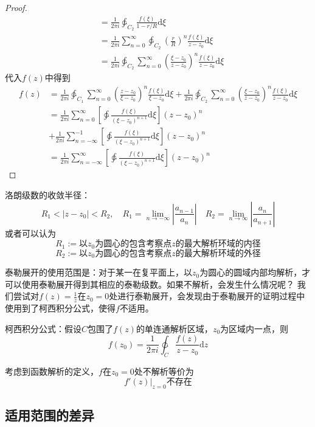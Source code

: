 \documentclass[12pt, a4paper, oneside]{ctexart}
\def\D{\mathrm{d}}
\newcommand{\F}[1][z]
{\ensuremath{f(#1)}}
\begin{document}
\begin{proof}
\begin{align*}
         & = \frac{1}{2\pi i} \ointctrclockwise_{C_2} \frac{\F[\xi]}{1-r/R}\D \xi                                                          \\
         & =\frac{1}{2\pi i} \sum_{n=0}^\infty \ointctrclockwise_{C_2} \left(\frac{r}{R}\right)^n  \frac{\F[\xi]}{z-z_0} \D \xi            \\
         & = \frac{1}{2\pi i} \ointctrclockwise_{C_2} \sum_{n=0}^\infty \left(\frac{\xi-z_0}{z-z_0}\right)^n  \frac{\F[\xi]}{z-z_0} \D \xi
    \end{align*}
    代入$\F$中得到
    \begin{align*}
        \F & =\frac{1}{2\pi i} \ointctrclockwise_{C_1} \sum_{n=0}^\infty  \left(\frac{z-z_0}{\xi-z_0}\right)^n  \frac{\F[\xi]}{\xi-z_0} \D \xi
        + \frac{1}{2\pi i} \ointctrclockwise_{C_2} \sum_{n=0}^\infty \left(\frac{\xi-z_0}{z-z_0}\right)^n  \frac{\F[\xi]}{z-z_0} \D \xi        \\
           & = \frac{1}{2\pi i}  \sum_{n=0}^\infty \left[\ointctrclockwise \frac{\F[\xi]}{(\xi-z_0)^{n+1}}\D \xi \right](z-z_0)^n              \\
           & +\frac{1}{2\pi i}  \sum_{n=-\infty}^{-1} \left[\ointctrclockwise \frac{\F[\xi]}{(\xi-z_0)^{n+1}}\D \xi\right](z-z_0)^n            \\
           & = \frac{1}{2\pi i}  \sum_{n=-\infty}^\infty \left[\ointctrclockwise \frac{\F[\xi]}{(\xi-z_0)^{n+1}}\D \xi \right](z-z_0)^n
    \end{align*}
\end{proof}
洛朗级数的收敛半径：
$$
    R_1<|z-z_0|<R_2,\quad R_1=\lim_{n\to -\infty} \left| \frac{a_{n-1}}{a_n} \right|\quad R_2=\lim_{n \to \infty} \left| \frac{a_n}{a_{n+1}} \right|
$$
或者可以认为
$$R_1 := \text{以$z_0$为圆心的包含考察点$z$的最大解析环域的内径}$$
$$R_2 := \text{以$z_0$为圆心的包含考察点$z$的最大解析环域的外径}$$

泰勒展开的使用范围是：对于某一在复平面上，以$z_0$为圆心的圆域内部均解析，才可以使用泰勒展开得到其相应的泰勒级数。如果不解析，会发生什么情况呢？
我们尝试对$f(z)=\frac{1}{z}$在$z_0=0$处进行泰勒展开，会发现由于泰勒展开的证明过程中使用到了柯西积分公式，使得$f$不适用。

柯西积分公式：假设$C$包围了$\F$的单连通解析区域，$z_0$为区域内一点，则
$$\F[z_0]=\frac{1}{2\pi i}\ointctrclockwise_C \frac{\F}{z-z_0}\D z$$

考虑到函数解析的定义，$f$在$z_0=0$处不解析等价为
$$
    \left. f'(z) \right|_{z=0} \text{不存在}
$$

\subsection{适用范围的差异}
\end{document}
